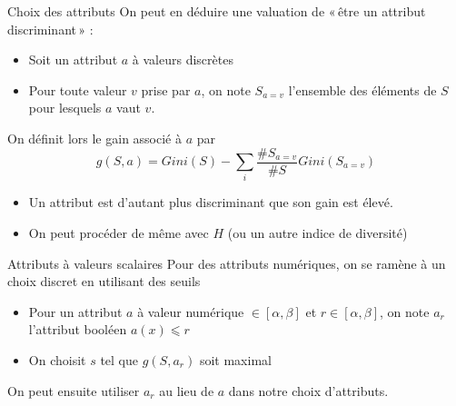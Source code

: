 \documentclass[hyperref={unicode}, xcolor={svgnames}, french]{beamer}
\begin{document}
\begin{frame}{Choix des attributs}
    On peut en déduire une valuation de « être un attribut discriminant » :
    \begin{itemize}
         \item Soit un attribut $a$ à valeurs discrètes
         \item Pour toute valeur $v$ prise par $a$, on note $S_{a=v}$ l'ensemble des éléments de $S$ pour lesquels $a$ vaut $v$.
    \end{itemize}
    On définit lors le gain associé à $a$ par
    \begin{equation}
        g(S, a) = Gini(S) - ∑_i\frac{\#S_{a=v}}{\#S}Gini(S_{a=v})
    \end{equation}
    \begin{itemize}
        \item Un attribut est d'autant plus discriminant que son gain est élevé.
        \item On peut procéder de même avec $H$ (ou un autre indice de diversité)
    \end{itemize}
\end{frame}

\begin{frame}{Attributs à valeurs scalaires}
    Pour des attributs numériques, on se ramène à un choix discret en utilisant des seuils
    \begin{itemize}
        \item Pour un attribut $a$ à valeur numérique $∈[α, β]$ et $r∈[α, β]$, on note $a_r$ l'attribut booléen $a(x)⩽r$
        \item On choisit $s$ tel que $g(S, a_r)$ soit maximal
    \end{itemize}
    On peut ensuite utiliser $a_r$ au lieu de $a$ dans notre choix d'attributs.
\end{frame}
\end{document}
